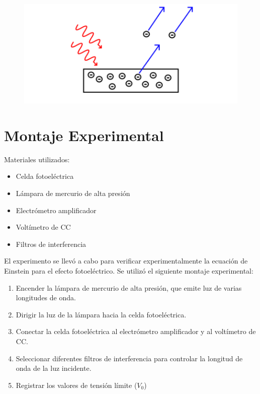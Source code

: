 \documentclass[letterpaper, 12pt]{article}
\begin{document}
\begin{figure}[H]
      \begin{center}
            \includegraphics[width=.5\linewidth]{Images/EfectoFotoelectrico.png}
            \caption{}
      \end{center}
\end{figure}

\section{Montaje Experimental}

Materiales utilizados:

\begin{multicols}{2}
      \begin{itemize}[label=$\triangleright$]
            \item Celda fotoeléctrica
            \item Lámpara de mercurio de alta presión
            \item Electrómetro amplificador
            \item Voltímetro de CC
            \item Filtros de interferencia
      \end{itemize}
\end{multicols}

El experimento se llevó a cabo para verificar
experimentalmente la ecuación de Einstein para el efecto
fotoeléctrico. Se utilizó el siguiente montaje
experimental:

\begin{enumerate}
      \item Encender la lámpara de mercurio de alta presión, que emite
            luz de varias longitudes de onda.
      \item Dirigir la luz de la lámpara hacia la celda fotoeléctrica.
      \item Conectar la celda fotoeléctrica al electrómetro
            amplificador y al voltímetro de CC\@{}.
      \item Seleccionar diferentes filtros de interferencia para
            controlar la longitud de onda de la luz incidente.
      \item Registrar los valores de tensión límite ($V_0$)
\end{enumerate}
\end{document}
